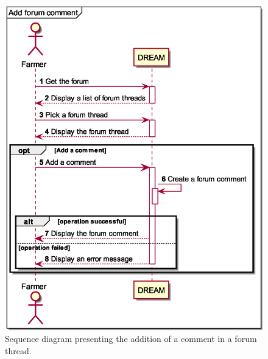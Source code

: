 \begin{figure}[H]
    \centering
    \includegraphics[scale=0.6, keepaspectratio, origin=c]{diagrams/sequence/add_forum_comment}
    \caption{Sequence diagram presenting the addition of a comment in a forum thread.}
    \label{fig:sd_add_forum_comment}
\end{figure}

